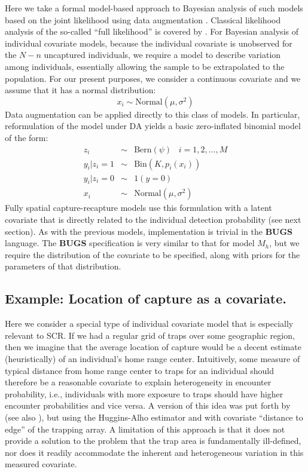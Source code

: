 Here we take a formal model-based approach to Bayesian analysis of
such models based on the joint likelihood
using data augmentation \citep{royle:2009}. Classical
likelihood analysis of the so-called ``full likelihood'' is covered
 by \citet{borchers_etal:2002}.  For Bayesian analysis of
individual covariate models, because the individual covariate is
unobserved for the $N-n$ uncaptured individuals, we require a model to
describe variation among individuals, essentially allowing the sample
to be extrapolated to the population.  For our present purposes, we
consider a continuous covariate and we assume that it has a normal
distribution:
\[
x_{i} \sim \mbox{Normal}(\mu,\sigma^{2})
\]
Data augmentation can be applied directly to this class of models. In
particular, reformulation of the model under DA yields a basic
zero-inflated binomial model of the form:
\begin{eqnarray*}
z_{i} &\sim& \mbox{Bern}(\psi) \; \; \; i=1,2,\ldots,M\\
y_{i}|{z_{i}\! =\! 1} &\sim& \mbox{Bin}(K,p_{i}(x_{i})) \\
y_{i} |{ z_{i}\! =\! 0} &\sim& 1(y=0)  \\
x_{i} & \sim & \mbox{Normal}(\mu,\sigma^{2})
\end{eqnarray*}
Fully spatial capture-recapture models use this
formulation with a latent covariate that is directly related to the
individual detection probability (see next section). As with the
previous models, implementation is trivial in the {\bf BUGS} language. The
{\bf BUGS} specification is very similar to that for model $M_h$, but we
require the distribution of the covariate to be specified, along with
priors for the parameters of that distribution.


\subsection{Example: Location of capture as a covariate.}

Here we consider a special type of individual covariate model that is
especially relevant to SCR.
If we had a regular grid of traps over some geographic region,
then we imagine that the average location of capture would be a decent
estimate (heuristically) of an individual's home range center.
Intuitively, some measure of typical distance from home range center to
traps for an individual should therefore be a reasonable  covariate to explain
heterogeneity in encounter probability, i.e., individuals with more
exposure to traps should have higher encounter probabilities and vice
versa.  A version of this idea was put forth by
\citet{boulanger_mclellan:2001} (see also \citet{ivan:2012}), but
using the Huggins-Alho estimator and with covariate ``distance to
edge'' of the trapping array. A limitation of this  approach is
that it does not provide a solution to the problem that the trap area
is fundamentally ill-defined, nor does it readily accommodate the
inherent and heterogeneous variation in this measured covariate.

